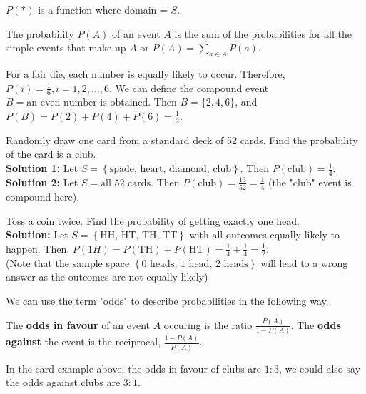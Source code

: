\begin{note}
    $P(*)$ is a function where domain = $S$.
\end{note}

\begin{definition}
    The probability $P(A)$ of an event $A$ is the sum of the probabilities for all the 
    simple events that make up $A$ or $P(A) = \displaystyle \sum_{a \in A} P(a).$
\end{definition}

\begin{example}
    For a fair die, each number is equally likely to occur. Therefore, $P(i) = \frac{1}{6}, i = 1, 2, \ldots, 6$.
    We can define the compound event $B = \text{an even number is obtained}$. Then $B = \{2, 4, 6\}$, and $P(B) = P(2) + P(4) + P(6) = \frac{1}{2}$.
\end{example}

\begin{example}
    Randomly draw one card from a standard deck of 52 cards. Find the probability of the card is a club.    \\
    \textbf{Solution 1: } Let $S = \left\{ \text{spade, heart, diamond, club} \right\}$. Then $P(\text{club}) = \frac{1}{4}$. \\
    \textbf{Solution 2: } Let $S = \text{all 52 cards}$. Then $P(\text{club}) = \frac{13}{52} = \frac{1}{4}$ (the "club" event is compound here).   \\
\end{example}

\begin{example}
    Toss a coin twice. Find the probability of getting exactly one head.    \\
    \textbf{Solution: } Let $S = \left\{  \text{HH, HT, TH, TT} \right\}$ with all outcomes equally likely to happen. Then,
    $P(1H) = P(\text{TH}) + P(\text{HT}) = \frac{1}{4} + \frac{1}{4} = \frac{1}{2}$.    \\
    (Note that the sample space $\left\{  \text{0 heads, 1 head, 2 heads} \right\}$ will lead to a wrong answer as the outcomes are not equally likely) \\
\end{example}

We can use the term "odds" to describe probabilities in the following way.
\begin{definition}
    The \textbf{odds in favour} of an event $A$ occuring is the ratio $\frac{P(A)}{1-P(A)}.$
    The \textbf{odds against} the event is the reciprocal, $\frac{1-P(A)}{P(A)}$.
\end{definition}

In the card example above, the odds in favour of clubs are $1:3$, we could also say the odds against clubs are $3:1$. 

\newpage